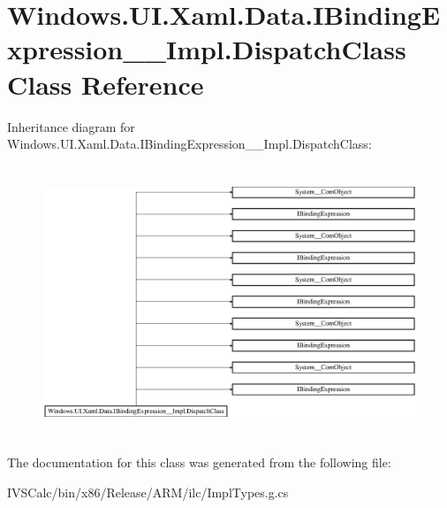 \hypertarget{class_windows_1_1_u_i_1_1_xaml_1_1_data_1_1_i_binding_expression_____impl_1_1_dispatch_class}{}\section{Windows.\+U\+I.\+Xaml.\+Data.\+I\+Binding\+Expression\+\_\+\+\_\+\+Impl.\+Dispatch\+Class Class Reference}
\label{class_windows_1_1_u_i_1_1_xaml_1_1_data_1_1_i_binding_expression_____impl_1_1_dispatch_class}
Inheritance diagram for Windows.\+U\+I.\+Xaml.\+Data.\+I\+Binding\+Expression\+\_\+\+\_\+\+Impl.\+Dispatch\+Class\+:\begin{figure}[H]
\begin{center}
\leavevmode
\includegraphics[height=8.148149cm]{class_windows_1_1_u_i_1_1_xaml_1_1_data_1_1_i_binding_expression_____impl_1_1_dispatch_class}
\end{center}
\end{figure}


The documentation for this class was generated from the following file\+:\begin{DoxyCompactItemize}
\item 
I\+V\+S\+Calc/bin/x86/\+Release/\+A\+R\+M/ilc/Impl\+Types.\+g.\+cs\end{DoxyCompactItemize}
